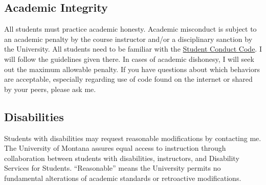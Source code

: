 \documentclass[12pt,letterpaper]{scrartcl}
\begin{document}
\subsection*{Academic Integrity}
All students must practice academic honesty. Academic misconduct is subject to
an academic penalty by the course instructor and/or a disciplinary sanction by
the University. All students need to be familiar with the
\href{http://www.umt.edu/vpsa/policies/student_conduct.php}{Student Conduct
Code}. I will follow the guidelines given there. In cases of
academic dishonesy, I will seek out the maximum allowable penalty. If you have
questions about which behaviors are acceptable, especially regarding use of code  
found on the internet or shared by your peers, please ask me.

\subsection*{Disabilities}
Students with disabilities may request reasonable modifications by contacting
me. The University of Montana assures equal access to instruction through
collaboration between students with disabilities, instructors, and Disability
Services for Students. “Reasonable” means the University permits no fundamental
alterations of academic standards or retroactive modifications. 
\end{document}
